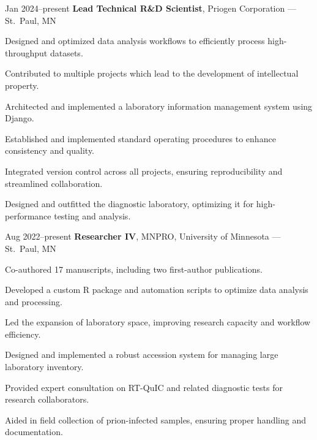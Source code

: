 \documentclass{resume}
\begin{document}
        \begin{twocolentry}{Jan 2024--present}
            \textbf{Lead Technical R\&D Scientist}, Priogen Corporation --- St.\ Paul, MN
        \end{twocolentry}
        \begin{onecolentry}
            \begin{highlights}
                \item Designed and optimized data analysis workflows to efficiently process high-throughput datasets.
                \item Contributed to multiple projects which lead to the development of intellectual property.
                \item Architected and implemented a laboratory information management system using Django.
                \item Established and implemented standard operating procedures to enhance consistency and quality.
                \item Integrated version control across all projects, ensuring reproducibility and streamlined collaboration.
                \item Designed and outfitted the diagnostic laboratory, optimizing it for high-performance testing and analysis.
            \end{highlights}
        \end{onecolentry}

        \begin{twocolentry}{Aug 2022--present}
            \textbf{Researcher IV}, MNPRO, University of Minnesota --- St.\ Paul, MN
        \end{twocolentry}
        \begin{onecolentry}
            \begin{highlights}
                \item Co-authored 17 manuscripts, including two first-author publications.
                \item Developed a custom R package and automation scripts to optimize data analysis and processing.
                \item Led the expansion of laboratory space, improving research capacity and workflow efficiency.
                \item Designed and implemented a robust accession system for managing large laboratory inventory.
                \item Provided expert consultation on RT-QuIC and related diagnostic tests for research collaborators.
                \item Aided in field collection of prion-infected samples, ensuring proper handling and documentation.
            \end{highlights}
        \end{onecolentry}
\end{document}
